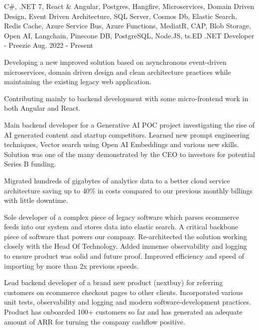 

\vspace{-0.5\baselineskip}
\begin{cventries}
  \cventry
    {C\#, .NET 7, React \& Angular, Postgres, Hangfire, Microservices, Domain Driven Design, Event Driven Architecture, SQL Server, Cosmos Db, Elastic Search, Redis Cache, Azure Service Bus, Azure Functions, MediatR, CAP, Blob Storage, Open AI, Langchain, Pinecone DB, PostgreSQL, Node.JS, ts.ED}
    {.NET Developer - Preezie}
    {Aug. 2022 - Present}
    {
      \begin{cvitems}
        \item {Developing a new improved solution based on asynchronous event-driven microservices, domain driven design and clean architecture practices while maintaining the existing legacy web application.}
        \item {Contributing mainly to backend development with some micro-frontend work in both Angular and React.}
        \item {Main backend developer for a Generative AI POC project investigating the rise of AI generated content and startup competitors. Learned new prompt engineering techniques, Vector search using Open AI Embeddings and various new skills. Solution was one of the many demonstrated by the CEO to investors for potential Series B funding.}
		\item {Migrated hundreds of gigabytes of analytics data to a better cloud service architecture saving up to 40\% in costs compared to our previous monthly billings with little downtime.}
        \item {Sole developer of a complex piece of legacy software which parses ecommerce feeds into our system and stores data into elastic search. A critical backbone piece of software that powers our company. Re-architected the solution working closely with the Head Of Technology. Added immense observability and logging to ensure product was solid and future proof. Improved efficiency and speed of importing by more than 2x previous speeds.}
        \item {Lead backend developer of a brand new product (nextbuy) for referring customers on ecommerce checkout pages to other clients. Incorporated various unit tests, observability and logging and modern software-development practices. Product has onboarded 100+ customers so far and has generated an adequate amount of ARR for turning the company cashflow positive.}
	  \end{cvitems}
}
\end{cventries}
